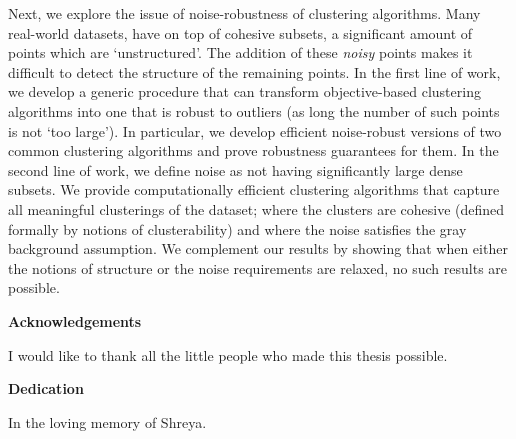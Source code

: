 \documentclass[letterpaper,12pt,titlepage,oneside,final]{book}
\let\origdoublepage\cleardoublepage
\newcommand{\clearemptydoublepage}{%
  \clearpage{\pagestyle{empty}\origdoublepage}}
\let\cleardoublepage\clearemptydoublepage
\begin{document}
Next, we explore the issue of noise-robustness of clustering algorithms. Many real-world datasets, have on top of cohesive subsets, a significant amount of points which are `unstructured'. The addition of these \textit{noisy} points makes it difficult to detect the structure of the remaining points. In the first line of work, we develop a generic procedure that can transform objective-based clustering algorithms into one that is robust to outliers (as long the number of such points is not `too large'). In particular, we develop efficient noise-robust versions of two common clustering algorithms and prove robustness guarantees for them. In the second line of work, we define noise as not having significantly large dense subsets. We provide computationally efficient clustering algorithms that capture all meaningful clusterings of the dataset; where the clusters are cohesive (defined formally by notions of clusterability) and where the noise satisfies the gray background assumption. We complement our results by showing that when either the notions
of structure or the noise requirements are relaxed, no such results are
possible.

   

\cleardoublepage

\begin{center}\textbf{Acknowledgements}\end{center}

I would like to thank all the little people who made this thesis possible.
\cleardoublepage

\begin{center}\textbf{Dedication}\end{center}

\begin{center}{In the loving memory of Shreya.}\end{center}
\cleardoublepage

\renewcommand\contentsname{Table of Contents}
\tableofcontents
\cleardoublepage
{}    %

\listoftables
\cleardoublepage
{}		%

\listoffigures
\cleardoublepage
{}		%

{}		%


\ifdefined\COMPLETE
\else
\end{document}
